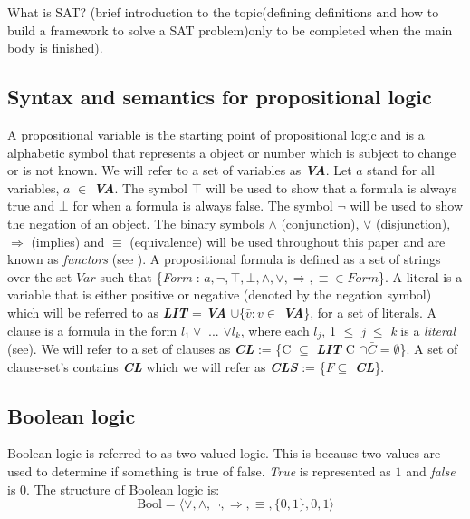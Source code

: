 \documentclass[11pt,a4paper]{report}
\begin{document}
What is SAT? (brief introduction to the topic(defining definitions and how to build a framework to solve a SAT problem)only to be completed when the main body is finished).

\subsection{Syntax and semantics for propositional logic}
\label{sec:syntaxsem}

A propositional variable is the starting point of propositional logic and is a alphabetic symbol that represents a object or number which is subject to change or is not known. We will refer to a set of variables as \textit{\textbf{VA}}. Let $a$ stand for all variables, $a$ $\in$ \textit{\textbf{VA}}. The symbol $\top$ will be used to show that a formula is always true and $\bot$ for when a formula is always false. The symbol $\neg$ will be used to show the negation of an object. The binary symbols $\land$ (conjunction), $\lor$ (disjunction), $\Rightarrow$ (implies) and $\equiv$ (equivalence) will be used throughout this paper and are known as \textit{functors} (see \cite{Marek2009Introduction}). A propositional formula is defined as a set of strings over the set $Var$ such that \{\textit{Form} : $a, \neg, \top, \bot, \land, \lor, \Rightarrow, \equiv \in Form$\}. A literal is a variable that is either positive or negative (denoted by the negation symbol) which will be referred to as \textbf{\textit{LIT}} =  \textit{\textbf{VA}} $\cup \{ \bar{v} : v \in$ \textbf{\textit{VA}}\}, for a set of literals. A clause is a formula in the form $l_1 \lor$ ... $\lor l_k$, where each $l_j$, 1 $\le$ \textit{j} $\le$ \textit{k} is a \textit{literal} (see\cite{Marek2009Introduction}). We will refer to a set of clauses as \textbf{\textit{CL}} := \{C $\subseteq$ \textbf{\textit{LIT}} C $\cap \bar{C} = \emptyset$\}. A set of clause-set's contains \textbf{\textit{CL}} which we will refer as \textbf{\textit{CLS}} := \{$F \subseteq$ \textit{\textbf{CL}}\}. 

\subsection{Boolean logic}
\label{sec:bool}

Boolean logic is referred to as two valued logic. This is because two values are used to determine if something is true of false. \emph{True} is represented as $1$ and \emph{false} is $0$. The structure of Boolean logic is:
\begin{displaymath}
\text{Bool} = \langle \lor, \land, \neg, \Rightarrow, \equiv,\{0,1\}, 0, 1 \rangle
\end{displaymath}
\end{document}
